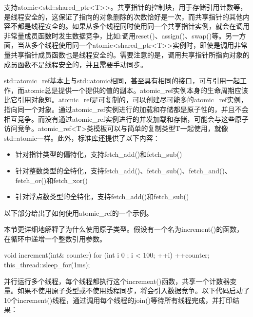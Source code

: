 
支持atomic<std::shared\_ptr<T>{}>。共享指针的控制块，用于存储引用计数等，是线程安全的，这保证了指向的对象删除的次数恰好是一次，而共享指针的其他内容不都是线程安全的。如果从多个线程同时使用同一个共享指针实例，就会在调用非常量成员函数时发生数据竞争，比如:调用reset()、assign()、swap()等。另一方面，当从多个线程使用同一个atomic<shared\_ptr<T>{}>实例时，即使是调用非常量共享指针成员函数也是线程安全的。需要注意的是，调用共享指针所指向对象的成员函数不是线程安全的，并且需要手动同步。


std::atomic\_ref基本上与std::atomic相同，甚至具有相同的接口，可与引用一起工作，而atomic总是提供一个提供的值的副本。atomic\_ref实例本身的生命周期应该比它引用对象短。atomic\_ref是可复制的，可以创建尽可能多的atomic\_ref实例，指向同一个对象。通过atomic\_ref实例进行的加载和存储都是原子性的，并且不会相互竞争。而没有通过atomic\_ref实例进行的并发加载和存储，可能会与这些原子访问竞争。atomic\_ref<T>类模板可以与简单的复制类型T一起使用，就像std::atomic一样。此外，标准库还提供了以下内容：

\begin{itemize}
\item
针对指针类型的偏特化，支持fetch\_add()和fetch\_sub()

\item
针对整数类型的全特化，支持fetch\_add()、fetch\_sub()、fetch\_and()、fetch\_or()和fetch\_xor()

\item
针对浮点数类型的全特化，支持fetch\_add()和fetch\_sub()
\end{itemize}

以下部分给出了如何使用atomic\_ref的一个示例。


本节更详细地解释了为什么使用原子类型。假设有一个名为increment()的函数，在循环中递增一个整数引用参数。

\begin{cpp}
void increment(int& counter)
{
    for (int i { 0 }; i < 100; ++i) {
        ++counter;
        this_thread::sleep_for(1ms);
    }
}
\end{cpp}

并行运行多个线程，每个线程都执行这个increment()函数，共享一个计数器变量。如果不使用原子类型或不使用线程同步，将会引入数据竞争。以下代码启动了10个increment()线程，通过调用每个线程的join()等待所有线程完成，并打印结果：

